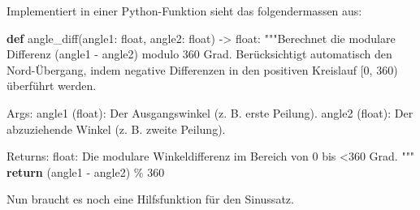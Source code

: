 \documentclass[
  nswissgerman,
  a4paper,
  DIV=11,
  numbers=noendperiod,
  ngerman]{scrreprt}
\newenvironment{Shaded}{\begin{snugshade}}{\end{snugshade}}
\newcommand{\BuiltInTok}[1]{\textcolor[rgb]{0.00,0.23,0.31}{#1}}
\newcommand{\CommentTok}[1]{\textcolor[rgb]{0.37,0.37,0.37}{#1}}
\newcommand{\ControlFlowTok}[1]{\textcolor[rgb]{0.00,0.23,0.31}{\textbf{#1}}}
\newcommand{\DecValTok}[1]{\textcolor[rgb]{0.68,0.00,0.00}{#1}}
\newcommand{\KeywordTok}[1]{\textcolor[rgb]{0.00,0.23,0.31}{\textbf{#1}}}
\newcommand{\NormalTok}[1]{\textcolor[rgb]{0.00,0.23,0.31}{#1}}
\newcommand{\OperatorTok}[1]{\textcolor[rgb]{0.37,0.37,0.37}{#1}}
\begin{document}
Implementiert in einer Python-Funktion sieht das folgendermassen aus:

\begin{Shaded}
\begin{Highlighting}[numbers=left,,]
\KeywordTok{def}\NormalTok{ angle\_diff(angle1: }\BuiltInTok{float}\NormalTok{, angle2: }\BuiltInTok{float}\NormalTok{) }\OperatorTok{{-}\textgreater{}} \BuiltInTok{float}\NormalTok{:}
    \CommentTok{"""Berechnet die modulare Differenz (angle1 {-} angle2) modulo 360 Grad.}
\CommentTok{    }
\CommentTok{    Berücksichtigt automatisch den Nord{-}Übergang, indem negative Differenzen}
\CommentTok{    in den positiven Kreislauf [0, 360) überführt werden.}

\CommentTok{    Args:}
\CommentTok{        angle1 (float): Der Ausgangswinkel (z. B. erste Peilung).}
\CommentTok{        angle2 (float): Der abzuziehende Winkel (z. B. zweite Peilung).}

\CommentTok{    Returns:}
\CommentTok{        float: Die modulare Winkeldifferenz im Bereich von 0 bis \textless{}360 Grad.}
\CommentTok{    """}
    \ControlFlowTok{return}\NormalTok{ (angle1 }\OperatorTok{{-}}\NormalTok{ angle2) }\OperatorTok{\%} \DecValTok{360}
\end{Highlighting}
\end{Shaded}

Nun braucht es noch eine Hilfsfunktion für den Sinussatz.
\end{document}
